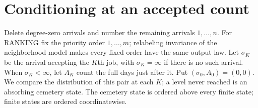 \documentclass[11pt]{article}
\begin{document}
\section{Conditioning at an accepted count}\label{sec:history}
Delete degree-zero arrivals and number the remaining arrivals
$1,\ldots,n$. For RANKING fix the priority order $1,\ldots,m$;
relabeling invariance of the neighborhood model makes every fixed
order have the same output law. Let $\sigma_K$ be the arrival accepting
the $K$th job, with $\sigma_K=\infty$ if there is no such arrival.
When $\sigma_K<\infty$, let $A_K$ count the full days just after it.
Put $(\sigma_0,A_0)=(0,0)$. We compare the distribution of this pair
at each $K$; a level never reached is an absorbing cemetery state.
The cemetery state is ordered above every finite state; finite states
are ordered coordinatewise.
\end{document}
